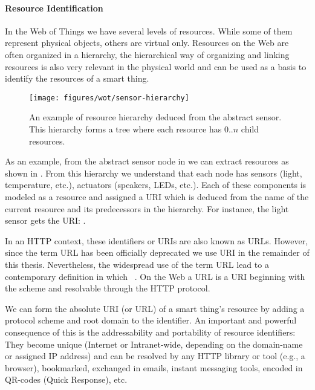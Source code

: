 \paragraph{Resource Identification}In the Web of Things we have several levels of resources. While some of them represent physical objects, others are virtual only. Resources on the Web are often organized in a hierarchy, the hierarchical way of organizing and linking resources is also very relevant in the physical world and can be used as a basis to identify the resources of a smart thing.
\begin{figure}
\centering
\texttt{[image: figures/wot/sensor-hierarchy]}
\caption{An example of resource hierarchy deduced from the abstract sensor. This hierarchy forms a tree where each resource has $0..n$ child resources.}
\label{fig:sensorHierarchy}
\end{figure}
As an example, from the abstract sensor node in  we can extract resources as shown in . From this hierarchy we understand that each node has sensors (light, temperature, etc.), actuators (speakers, LEDs, etc.). Each of these components is modeled as a resource and assigned a URI which is deduced from the name of the current resource and its predecessors in the hierarchy. For instance, the light sensor gets the URI:
.

In an HTTP context, these identifiers or URIs are also known as URLs. However, since the term URL has been officially deprecated we use URI in the remainder of this thesis. Nevertheless, the widespread use of the term URL lead to a contemporary definition in which ~. On the Web a URL is a URI beginning with the  scheme and resolvable through the HTTP protocol.

We can form the absolute URI (or URL) of a smart thing's resource by adding a protocol scheme and root domain to the identifier. An important and powerful consequence of this is the addressability and portability of resource identifiers: They become unique (Internet or Intranet-wide, depending on the domain-name or assigned IP address) and can be resolved by any HTTP library or tool (e.g., a browser), bookmarked, exchanged in emails, instant messaging tools, encoded in QR-codes (Quick Response), etc.


